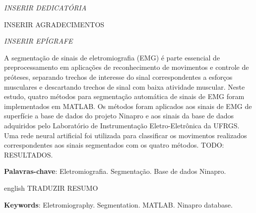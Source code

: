 \documentclass[
	12pt,				%
	openright,			%
	oneside,			%
	a4paper,			%
	english,			%
	francais,			%
	spanish,			%
	brazil				%
	]{abntex2}
\begin{document}
\begin{dedicatoria}
   \vspace*{\fill}
   \centering
   \noindent
   \textit{ INSERIR DEDICATÓRIA } \vspace*{\fill}
\end{dedicatoria}

\begin{agradecimentos}
	INSERIR AGRADECIMENTOS
\end{agradecimentos}

\begin{epigrafe}
    \vspace*{\fill}
	\begin{flushright}
		\textit{ INSERIR EPÍGRAFE }
	\end{flushright}
\end{epigrafe}


\setlength{\absparsep}{18pt} %
\begin{resumo}

	A segmentação de sinais de eletromiografia (EMG) é parte essencial de preprocessamento em aplicações de reconhecimento de movimentos e controle de próteses, separando trechos de interesse do sinal correspondentes a esforços musculares e descartando trechos de sinal com baixa atividade muscular. Neste estudo, quatro métodos para segmentação automática de sinais de EMG foram implementados em MATLAB. Os métodos foram aplicados aos sinais de EMG de superfície a base de dados do projeto Ninapro e aos sinais da base de dados adquiridos pelo Laboratório de Instrumentação Eletro-Eletrônica da UFRGS. Uma rede neural artificial foi utilizada para classificar os movimentos realizados correspondentes aos sinais segmentados com os quatro métodos. TODO: RESULTADOS.

	\vspace{\onelineskip}
	\textbf{Palavras-chave}: Eletromiografia. Segmentação. Base de dados Ninapro.
\end{resumo}

\begin{resumo}[Abstract]
 \begin{otherlanguage*}{english}
	TRADUZIR RESUMO
	
   \vspace{\onelineskip}
   \noindent 
   \textbf{Keywords}: Eletromiography. Segmentation. MATLAB. Ninapro database.
 \end{otherlanguage*}
\end{resumo}
\end{document}
